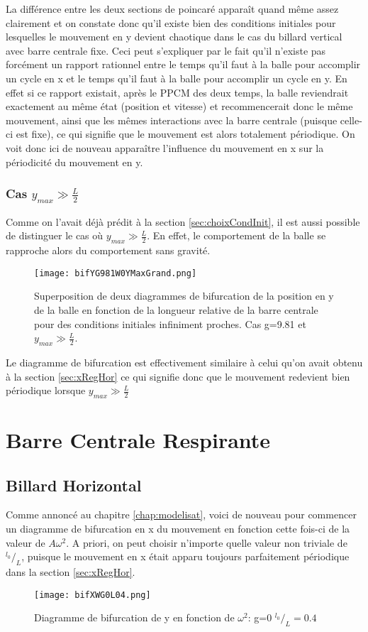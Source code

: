 \documentclass[a4paper]{report}
\begin{document}
La différence entre les deux sections de poincaré apparaît quand même assez clairement et on constate donc qu'il existe bien des conditions initiales pour lesquelles le mouvement en y devient chaotique dans le cas du billard vertical avec barre centrale fixe. Ceci peut s'expliquer par le fait qu'il n'existe pas forcément un rapport rationnel entre le temps qu'il faut à la balle pour accomplir un cycle en x et le temps qu'il faut à la balle pour accomplir un cycle en y. En effet si ce rapport existait, après le PPCM des deux temps, la balle reviendrait exactement au même état (position et vitesse) et recommencerait donc le même mouvement, ainsi que les mêmes interactions avec la barre centrale (puisque celle-ci est fixe), ce qui signifie que le mouvement est alors totalement périodique. On voit donc ici de nouveau apparaître l'influence du mouvement en x sur la périodicité du mouvement en y.

\subsection{Cas $ y_{max} \gg \frac{L}{2} $}

Comme on l'avait déjà prédit à la section \ref{sec:choixCondInit}, il est aussi possible de distinguer le cas où \(y_{max} \gg \frac{L}{2} \). En effet, le comportement de la balle se rapproche alors du comportement sans gravité.
\begin{figure}[h!]
   \texttt{[image: bifYG981W0YMaxGrand.png]}
      \caption[Diagramme de Bifurcation en y: g=9.81 \(\omega=0 \; y_{max} \gg \frac{L}{2} \)]{Superposition de deux diagrammes de bifurcation de la position en y de la balle en fonction de la longueur relative de la barre centrale pour des conditions initiales infiniment proches. Cas g=9.81 et \(y_{max} \gg \frac{L}{2}\).}
\end{figure}
Le diagramme de bifurcation est effectivement similaire à celui qu'on avait obtenu à la section \ref{sec:xRegHor} ce qui signifie donc que le mouvement redevient bien périodique lorsque \( y_{max} \gg \frac{L}{2} \)


\chapter{Barre Centrale Respirante}

\section{Billard Horizontal}
Comme annoncé au chapitre \ref{chap:modelisat}, voici de nouveau pour commencer un diagramme de bifurcation en x du mouvement en fonction cette fois-ci de la valeur de \(A \omega^2 \). A priori, on peut choisir n'importe quelle valeur non triviale de \(^{l_0}/_L\), puisque le mouvement en x était apparu toujours parfaitement périodique dans la section \ref{sec:xRegHor}.
\begin{figure}[h!]
   \texttt{[image: bifXWG0L04.png]}
      \caption[Diagramme de bifurcation de y en fonction de \(\omega ^2\): g=0, \(^{l_0}/_L=0.4\)]{Diagramme de bifurcation de y en fonction de \(\omega ^2\): g=0   \(^{l_0}/_L=0.4\)}
\end{figure}
\end{document}
